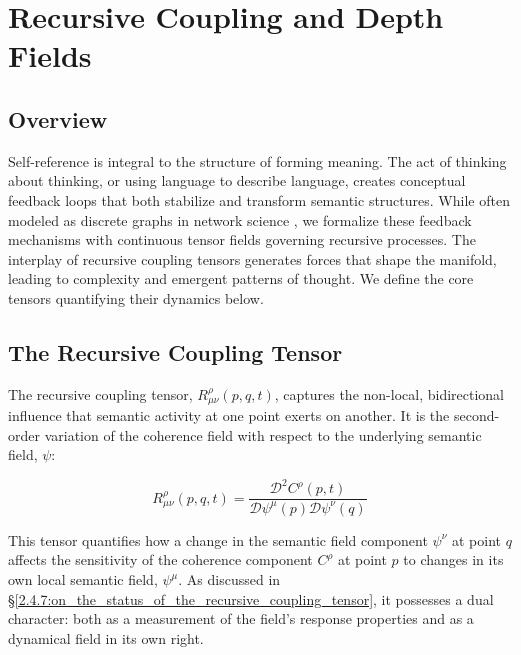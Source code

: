 \chapter{Recursive Coupling and Depth Fields}
\label{4:recursive_coupling_and_depth_fields}


\section{Overview}
\label{4.1:overview}

Self-reference is integral to the structure of forming meaning. The act of thinking about thinking, or using language to describe language, creates conceptual feedback loops that both stabilize and transform semantic structures. While often modeled as discrete graphs in network science \autocite{Barabasi2016}, we formalize these feedback mechanisms with continuous tensor fields governing recursive processes. The interplay of recursive coupling tensors generates forces that shape the manifold, leading to complexity and emergent patterns of thought. We define the core tensors quantifying their dynamics below.


\section{The Recursive Coupling Tensor}
\label{4.2:the_recursive_coupling_tensor}

The recursive coupling tensor, \(R^\rho_{\mu\nu}(p, q, t)\), captures the non-local, bidirectional influence that semantic activity at one point exerts on another. It is the second-order variation of the coherence field with respect to the underlying semantic field, \(\psi\):

\begin{equation}
R^\rho_{\mu\nu}(p, q, t) = \frac{\mathcal{D}^2 C^\rho(p,t)}{\mathcal{D} \psi^\mu(p) \mathcal{D} \psi^\nu(q)}
\end{equation}

This tensor quantifies how a change in the semantic field component \(\psi^\nu\) at point \(q\) affects the sensitivity of the coherence component \(C^\rho\) at point \(p\) to changes in its own local semantic field, \(\psi^\mu\). As discussed in \S\ref{2.4.7:on_the_status_of_the_recursive_coupling_tensor}, it possesses a dual character: both as a measurement of the field's response properties and as a dynamical field in its own right.

